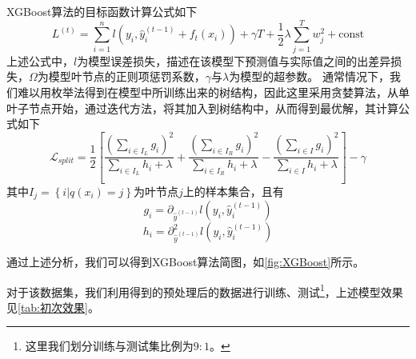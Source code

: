 \documentclass{MathorCupModeling}
\begin{document}
		XGBoost算法的目标函数计算公式如下
		\begin{equation}
			L^{\left(t\right)}=\sum\limits_{i=1}^{n}l\left(y_i,\hat{y}_{i}^{\left(t-1\right)}+f_t\left(x_i\right)\right)+\gamma T+\frac{1}{2}\lambda\sum\limits_{j=1}^T{w_j^2}+\mathrm{const} \label{fXGBoostL}
		\end{equation}
		上述公式中，$l$为模型误差损失，描述在该模型下预测值与实际值之间的出差异损失，$\Omega$为模型叶节点的正则项惩罚系数，$\gamma$与$\lambda$为模型的超参数\textcolor{blue}{\cite{pxgboost2}}。
		通常情况下，我们难以用枚举法得到在模型中所训练出来的树结构，因此这里采用贪婪算法，从单叶子节点开始，通过迭代方法，将其加入到树结构中，从而得到最优解，其计算公式\textcolor{blue}{\cite{pxgboost3}}如下
		\begin{equation}
			\mathcal{L}_{split}=\frac{1}{2}\left[\frac{\left(\sum_{i\in I_L}g_i\right)^2}{\sum_{i\in I_L}h_i+\lambda}+\frac{\left(\sum_{i\in I_R}g_i\right)^2}{\sum_{i\in I_R}h_i+\lambda}-\frac{\left(\sum_{i\in I}g_i\right)^2}{\sum_{i\in I}h_i+\lambda}\right]-\gamma \label{fXGBoostLsplit}
		\end{equation}
		其中$I_j=\left\{i|q\left(x_i\right)=j\right\}$为叶节点$j$上的样本集合\textcolor{blue}{\cite{pxgboost2}}，且有
		\begin{equation}
			g_i=\partial_{\hat{y}^{\left(t-1\right)}}l\left(y_i,\hat{y}_i^{\left(t-1\right)}\right) \label{xgboostgi}
		\end{equation}
		\begin{equation}
			h_i=\partial_{\hat{y}^{\left(t-1\right)}}^2l\left(y_i,\hat{y}_i^{\left(t-1\right)}\right) \label{xgboosthi}
		\end{equation}
	
		通过上述分析，我们可以得到XGBoost算法简图，如\textcolor{blue}{\cref{fig:XGBoost}}所示。

	对于该数据集，我们利用得到的预处理后的数据进行训练、测试\textcolor{blue}{\footnote{这里我们划分训练与测试集比例为$9:1$。}}，上述模型效果见\textcolor{blue}{\cref{tab:初次效果}}。
\begin{table}[H]
	\centering
	\caption{RF与XGBoost初次学习效果}
	\label{tab:初次效果}
\end{table}
\end{document}
